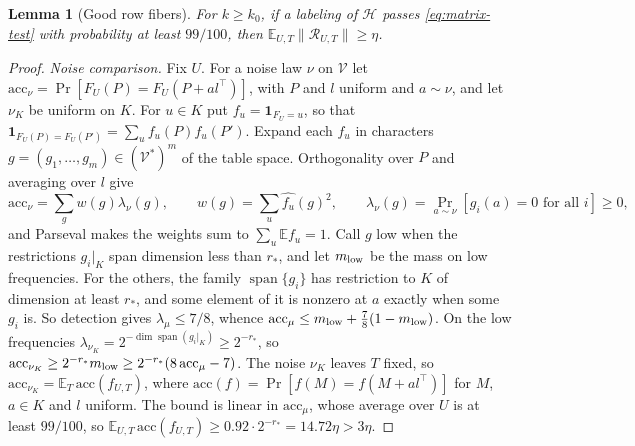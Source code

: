 \documentclass[11pt]{article}
\newtheorem{lemma}[theorem]{Lemma}
\newcommand{\E}{\mathbb E}
\newcommand{\Span}{\operatorname{span}}
\newcommand{\ind}{\mathbf 1}
\begin{document}
\begin{lemma}[Good row fibers]\label{lem:advice}
For $k\ge k_0$, if a labeling of $\mathcal H$ passes \eqref{eq:matrix-test} with
probability at least $99/100$, then $\E_{U,T}\|\mathcal R_{U,T}\|\ge\eta$.
\end{lemma}

\begin{proof}
\emph{Noise comparison.} Fix $U$. For a noise law $\nu$ on $\mathcal V$ let
$\mathrm{acc}_\nu=\Pr[F_U(P)=F_U(P+al^\top)]$, with $P$ and $l$ uniform and
$a\sim\nu$, and let $\nu_K$ be uniform on $K$. For $u\in K$ put
$f_u=\ind_{F_U=u}$, so that $\ind_{F_U(P)=F_U(P')}=\sum_uf_u(P)f_u(P')$.
Expand each $f_u$ in characters $g=(g_1,\ldots,g_m)\in(\mathcal V^*)^m$ of
the table space. Orthogonality over $P$ and averaging over $l$ give
\[
 \mathrm{acc}_\nu=\sum_gw(g)\lambda_\nu(g),
 \qquad w(g)=\sum_u\widehat{f_u}(g)^2,
 \qquad
 \lambda_\nu(g)=\Pr_{a\sim\nu}[g_i(a)=0\text{ for all }i]\ge0,
\]
and Parseval makes the weights sum to $\sum_u\E f_u=1$. Call $g$ low when
the restrictions $g_i|_K$ span dimension less than $r_*$, and let
$m_{\rm low}$ be the mass on low frequencies. For the others, the family
$\Span\{g_i\}$ has restriction to $K$ of dimension at least $r_*$, and
some element of it is nonzero at $a$ exactly when some $g_i$ is. So detection
gives $\lambda_\mu\le7/8$, whence $\mathrm{acc}_\mu\le m_{\rm low}+\frac78(1-m_{\rm low})$.
On the low frequencies $\lambda_{\nu_K}=2^{-\dim\Span(g_i|_K)}\ge2^{-r_*}$, so
$\mathrm{acc}_{\nu_K}\ge2^{-r_*}m_{\rm low}\ge2^{-r_*}(8\,\mathrm{acc}_\mu-7)$.
The noise $\nu_K$ leaves $T$ fixed, so $\mathrm{acc}_{\nu_K}=\E_T\,\mathrm{acc}(f_{U,T})$,
where $\mathrm{acc}(f)=\Pr[f(M)=f(M+al^\top)]$ for $M$, $a\in K$ and $l$ uniform.
The bound is linear in $\mathrm{acc}_\mu$, whose average over $U$ is at least
$99/100$, so $\E_{U,T}\,\mathrm{acc}(f_{U,T})\ge0.92\cdot2^{-r_*}=14.72\eta>3\eta$.


\end{proof}
\end{document}
